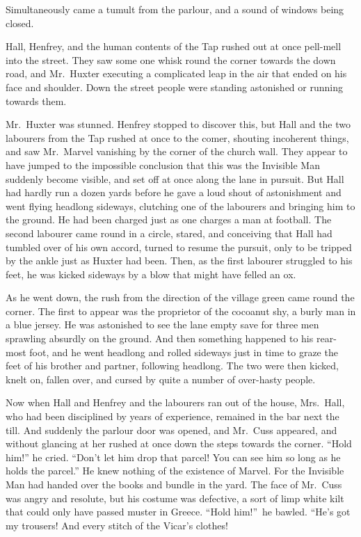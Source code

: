 Simultaneously came a tumult from the parlour, and a sound of windows being closed.

Hall, Henfrey, and the human contents of the Tap rushed out at once pell-mell into the street. They saw some one whisk round the corner towards the down road, and Mr.\ Huxter executing a complicated leap in the air that ended on his face and shoulder. Down the street people were standing astonished or running towards them.

Mr.\ Huxter was stunned. Henfrey stopped to discover this, but Hall and the two labourers from the Tap rushed at once to the comer, shouting incoherent things, and saw Mr.\ Marvel vanishing by the corner of the church wall. They appear to have jumped to the impossible conclusion that this was the Invisible Man suddenly become visible, and set off at once along the lane in pursuit. But Hall had hardly run a dozen yards before he gave a loud shout of astonishment and went flying headlong sideways, clutching one of the labourers and bringing him to the ground. He had been charged just as one charges a man at football. The second labourer came round in a circle, stared, and conceiving that Hall had tumbled over of his own accord, turned to resume the pursuit, only to be tripped by the ankle just as Huxter had been. Then, as the first labourer struggled to his feet, he was kicked sideways by a blow that might have felled an ox.

As he went down, the rush from the direction of the village green came round the corner. The first to appear was the proprietor of the cocoanut shy, a burly man in a blue jersey. He was astonished to see the lane empty save for three men sprawling absurdly on the ground. And then something happened to his rear-most foot, and he went headlong and rolled sideways just in time to graze the feet of his brother and partner, following headlong. The two were then kicked, knelt on, fallen over, and cursed by quite a number of over-hasty people.

Now when Hall and Henfrey and the labourers ran out of the house, Mrs.\ Hall, who had been disciplined by years of experience, remained in the bar next the till. And suddenly the parlour door was opened, and Mr.\ Cuss appeared, and without glancing at her rushed at once down the steps towards the corner. “Hold him!” he cried. “Don’t let him drop that parcel! You can see him so long as he holds the parcel.” He knew nothing of the existence of Marvel. For the Invisible Man had handed over the books and bundle in the yard. The face of Mr.\ Cuss was angry and resolute, but his costume was defective, a sort of limp white kilt that could only have passed muster in Greece. “Hold him!”\ he bawled. “He’s got my trousers! And every stitch of the Vicar’s clothes!

